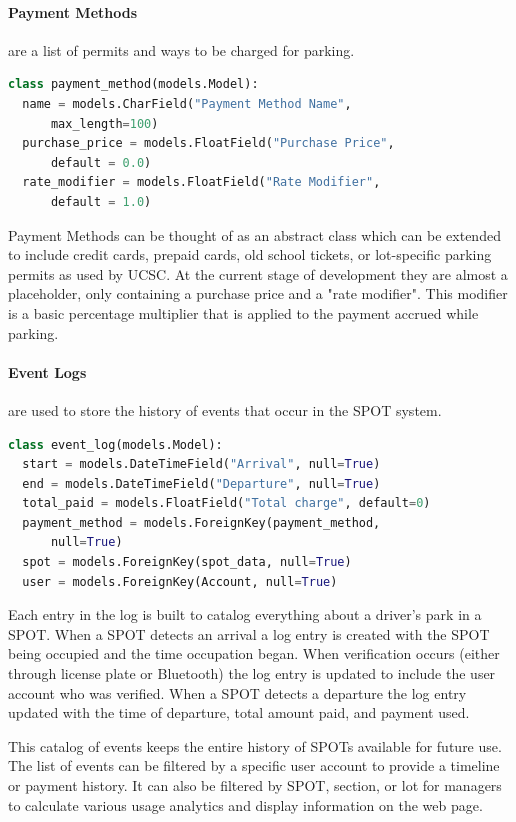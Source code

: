 \paragraph{Payment Methods}
are a list of permits and ways to be charged for parking.
\begin{lstlisting}[language=Python]
class payment_method(models.Model):
  name = models.CharField("Payment Method Name", 
      max_length=100)
  purchase_price = models.FloatField("Purchase Price", 
      default = 0.0)
  rate_modifier = models.FloatField("Rate Modifier", 
      default = 1.0)
\end{lstlisting}
Payment Methods can be thought of as an abstract class which can be extended to include credit cards, prepaid cards, old school tickets, or lot-specific parking permits as used by UCSC.
At the current stage of development they are almost a placeholder, only containing a purchase price and a "rate modifier".
This modifier is a basic percentage multiplier that is applied to the payment accrued while parking.

\paragraph{Event Logs}
are used to store the history of events that occur in the SPOT system.
\begin{lstlisting}[language=Python]
class event_log(models.Model):
  start = models.DateTimeField("Arrival", null=True)
  end = models.DateTimeField("Departure", null=True)
  total_paid = models.FloatField("Total charge", default=0)
  payment_method = models.ForeignKey(payment_method, 
      null=True)
  spot = models.ForeignKey(spot_data, null=True)
  user = models.ForeignKey(Account, null=True)
\end{lstlisting}
Each entry in the log is built to catalog everything about a driver's park in a SPOT.
When a SPOT detects an arrival a log entry is created with the SPOT being occupied and the time occupation began.
When verification occurs (either through license plate or Bluetooth) the log entry is updated to include the user account who was verified.
When a SPOT detects a departure the log entry updated with the time of departure, total amount paid, and payment used.

This catalog of events keeps the entire history of SPOTs available for future use.  The list of events can be filtered by a specific user account to provide a timeline or payment history.
It can also be filtered by SPOT, section, or lot for managers to calculate various usage analytics and display information on the web page.

